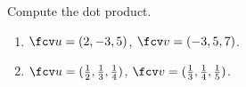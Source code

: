 Compute the dot product.

\begin{enumerate}
\item $\fcv u=( 2,-3,5)$, $\fcv v=( -3, 5,7 ) $.

\item $\fcv u=( \frac{1}{2},\frac{1}{3},\frac{1}{4})$, $\fcv v=( \frac{1}{3}, \frac{1}{4},\frac{1}{5} ) $.

\end{enumerate}
